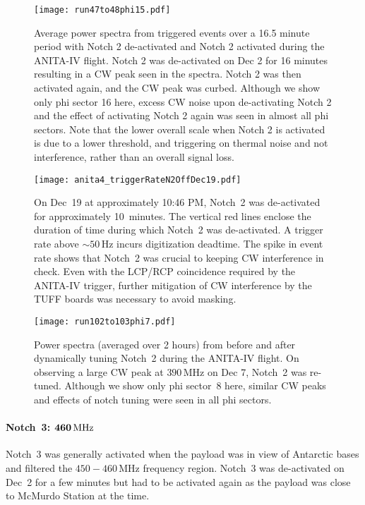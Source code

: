 \documentclass[preprint,12pt]{elsarticle}
\begin{document}
\begin{figure}
\centering
\texttt{[image: run47to48phi15.pdf]}
\caption[]{Average power spectra from triggered events over a 16.5 minute period with Notch 2 de-activated and Notch 2 activated during the ANITA-IV flight. Notch 2 was de-activated on Dec 2 for 16 minutes resulting in a CW peak seen in the spectra. Notch 2 was then activated again, and the CW peak was curbed. Although we show only phi sector 16 here, excess CW noise upon de-activating Notch 2 and the effect of activating Notch 2 again was seen in almost all phi sectors. Note that the lower overall scale when Notch 2 is activated is due to a lower threshold, and triggering on thermal noise and not interference, rather than an overall signal loss.}
\label{spectra_notch2_offon_dec2}
\end{figure}

\begin{figure}
\centering
\texttt{[image: anita4\_triggerRateN2OffDec19.pdf]}
\caption[]{On Dec~19 at approximately 10:46 PM, Notch~2 was de-activated for approximately 10~minutes. The vertical red lines enclose the duration of time during which Notch~2 was de-activated. 
A trigger rate above $\sim50\,\mbox{Hz}$ incurs digitization deadtime.
The spike in event rate shows that Notch~2 was crucial to keeping CW interference in check. 
Even with the LCP/RCP coincidence required by the ANITA-IV trigger, further mitigation of CW interference by the TUFF boards was necessary to avoid masking.
}
\label{rate}
\end{figure}

\begin{figure}[H]
\centering
\texttt{[image: run102to103phi7.pdf]}
\caption{Power spectra (averaged over 2 hours) from before and after dynamically tuning 
Notch~2 during the ANITA-IV flight. On observing a large CW peak at $390\,\mbox{MHz}$ on Dec 7, Notch~2 was re-tuned. 
Although we show only phi sector~8 here, similar CW peaks and effects of notch tuning were seen in all phi sectors.}
\label{spectra_notch2_tuning}
\end{figure}

\paragraph{Notch~3: $\bold{460}\,\mbox{MHz}$}

Notch~3 was generally activated when the payload was in view of Antarctic bases and filtered 
the $450 - 460\,\mbox{MHz}$ frequency region. Notch~3 was de-activated on Dec~2 for a few 
minutes but had to be activated again as the payload was close to McMurdo Station at the time. 
\end{document}
